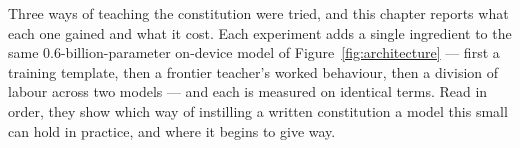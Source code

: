 %
%
%
%
%

Three ways of teaching the constitution were tried, and this chapter reports what each one gained and what it cost. Each experiment adds a single ingredient to the same 0.6-billion-parameter on-device model of Figure~\ref{fig:architecture} --- first a training template, then a frontier teacher's worked behaviour, then a division of labour across two models --- and each is measured on identical terms. Read in order, they show which way of instilling a written constitution a model this small can hold in practice, and where it begins to give way.

